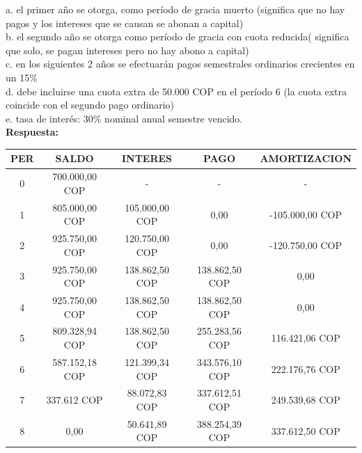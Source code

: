 \begin{itemize}
       a.	el primer año se otorga, como período de gracia muerto (significa que no hay pagos y los intereses que se causan se abonan a capital)\\
       b.	el segundo año se otorga como período de gracia con cuota reducida( significa que solo, se pagan intereses pero no hay abono a capital) \\
       c.	en los siguientes 2 años se efectuarán pagos semestrales ordinarios crecientes en un 15\% \\
       d.	debe incluirse una cuota extra de 50.000 COP en el período 6 (la cuota extra coincide con el segundo pago ordinario) \\
       e.	tasa de interés: 30\% nominal anual semestre vencido.\\

       \textbf{ Respuesta:}\\
       \begin{center}
        \begin{tabular}{| c | c | c | c | c |}\hline
           \textbf{PER} & \textbf{SALDO} & \textbf{INTERES} & \textbf{PAGO} & \textbf{AMORTIZACION}  \\ \hline
        0 & 700.000,00 COP & - & - & - \\ \hline
        1 & 805.000,00 COP & 105.000,00 COP & 0,00 & -105.000,00 COP \\ \hline
        2 & 925.750,00 COP & 120.750,00 COP & 0,00 & -120.750,00 COP \\ \hline
        3 & 925.750,00 COP & 138.862,50  COP & 138.862,50 COP & 0,00 \\ \hline
        4 & 925.750,00 COP & 138.862,50 COP & 138.862,50 COP & 0,00 \\ \hline
        5 & 809.328,94 COP & 138.862,50 COP & 255.283,56 COP & 116.421,06 COP \\ \hline
        6 & 587.152,18 COP & 121.399,34 COP & 343.576,10 COP & 222.176,76 COP \\ \hline
        7 & 337.612 COP & 88.072,83 COP & 337.612,51 COP & 249.539,68 COP \\ \hline
        8 & 0,00 & 50.641,89 COP & 388.254,39 COP & 337.612,50 COP \\ \hline
        \end{tabular}\\
        \end{center}


\end{itemize}
